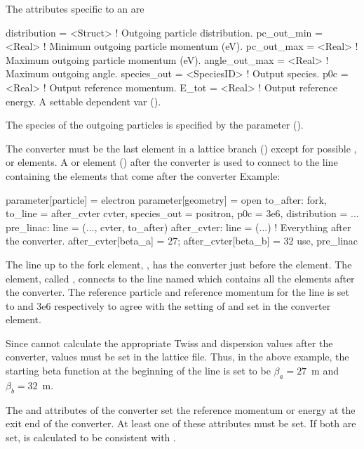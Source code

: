 The attributes specific to an  are 
\begin{example}
  distribution    = <Struct>    ! Outgoing particle distribution.
  pc_out_min      = <Real>      ! Minimum outgoing particle momentum (eV).
  pc_out_max      = <Real>      ! Maximum outgoing particle momentum (eV).
  angle_out_max   = <Real>      ! Maximum outgoing angle.
  species_out     = <SpeciesID> ! Output species.
  p0c             = <Real>      ! Output reference momentum.
  E_tot           = <Real>      ! Output reference energy. A settable dependent var ().
\end{example}

The species of the outgoing particles is specified by the  parameter
().

The converter must be the last element in a lattice branch () except for possible
,  or  elements. A  or  element
() after the converter is used to connect to the line containing the elements that come
after the converter Example:
\begin{example}
  parameter[particle] = electron
  parameter[geometry] = open
  to_after: fork, to_line = after_cvter
  cvter, species_out = positron, p0c = 3e6, distribution = ...
  pre_linac: line = (..., cvter, to_after)
  after_cvter: line = (...)                ! Everything after the converter.
  after_cvter[beta_a] = 27; after_cvter[beta_b] = 32
  use, pre_linac
\end{example}
The line up to the fork element, , has the converter just before the 
element. The  element, called , connects to the line named 
which contains all the elements after the converter. The reference particle and reference momentum
for the  line is set to  and 3e6 respectively to agree with the setting
of  and  set in the converter element.

Since \bmad cannot calculate the appropriate Twiss and dispersion values after the converter, values
must be set in the lattice file.  Thus, in the above example, the starting beta function at the
beginning of the  line is set to be $\beta_a = 27$~m and $\beta_b = 32$~m.

The  and  attributes of the converter set the reference momentum or energy at the
exit end of the converter. At least one of these attributes must be set. If both are set, 
is calculated to be consistent with .


